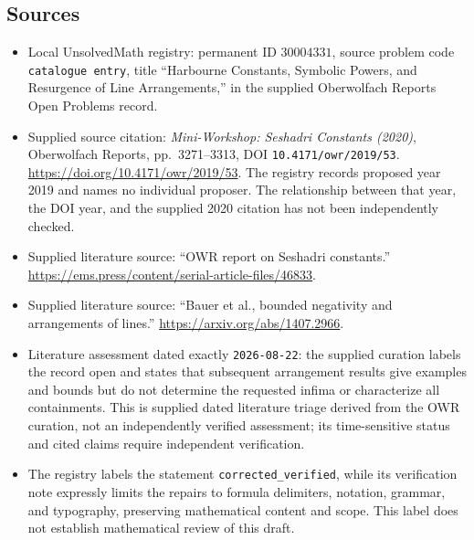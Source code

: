 \documentclass[11pt]{article}
\begin{document}
\subsection{Sources}
\begin{itemize}
\item Local UnsolvedMath registry: permanent ID \(30004331\), source problem code \texttt{catalogue entry}, title ``Harbourne Constants, Symbolic Powers, and Resurgence of Line Arrangements,'' in the supplied Oberwolfach Reports Open Problems record.
\item Supplied source citation: \emph{Mini-Workshop: Seshadri Constants (2020)}, Oberwolfach Reports, pp.\ 3271--3313, DOI \texttt{10.4171/owr/2019/53}. \url{https://doi.org/10.4171/owr/2019/53}. The registry records proposed year 2019 and names no individual proposer. The relationship between that year, the DOI year, and the supplied 2020 citation has not been independently checked.
\item Supplied literature source: ``OWR report on Seshadri constants.'' \url{https://ems.press/content/serial-article-files/46833}.
\item Supplied literature source: ``Bauer et al., bounded negativity and arrangements of lines.'' \url{https://arxiv.org/abs/1407.2966}.
\item Literature assessment dated exactly \texttt{2026-08-22}: the supplied curation labels the record open and states that subsequent arrangement results give examples and bounds but do not determine the requested infima or characterize all containments. This is supplied dated literature triage derived from the OWR curation, not an independently verified assessment; its time-sensitive status and cited claims require independent verification.
\item The registry labels the statement \texttt{corrected\_verified}, while its verification note expressly limits the repairs to formula delimiters, notation, grammar, and typography, preserving mathematical content and scope. This label does not establish mathematical review of this draft.
\end{itemize}
\end{document}
